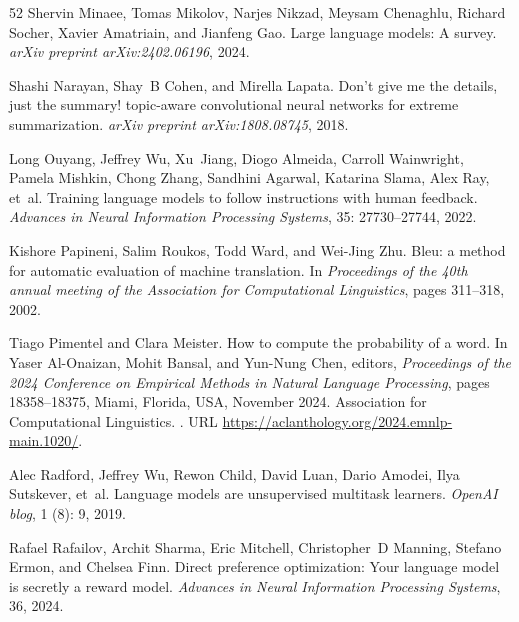 \begin{thebibliography}{52}
Shervin Minaee, Tomas Mikolov, Narjes Nikzad, Meysam Chenaghlu, Richard Socher, Xavier Amatriain, and Jianfeng Gao.
\newblock Large language models: A survey.
\newblock \emph{arXiv preprint arXiv:2402.06196}, 2024.

Shashi Narayan, Shay~B Cohen, and Mirella Lapata.
\newblock Don't give me the details, just the summary! topic-aware convolutional neural networks for extreme summarization.
\newblock \emph{arXiv preprint arXiv:1808.08745}, 2018.

Long Ouyang, Jeffrey Wu, Xu~Jiang, Diogo Almeida, Carroll Wainwright, Pamela Mishkin, Chong Zhang, Sandhini Agarwal, Katarina Slama, Alex Ray, et~al.
\newblock Training language models to follow instructions with human feedback.
\newblock \emph{Advances in Neural Information Processing Systems}, 35: 27730--27744, 2022.

Kishore Papineni, Salim Roukos, Todd Ward, and Wei-Jing Zhu.
\newblock Bleu: a method for automatic evaluation of machine translation.
\newblock In \emph{Proceedings of the 40th annual meeting of the Association for Computational Linguistics}, pages 311--318, 2002.

Tiago Pimentel and Clara Meister.
\newblock How to compute the probability of a word.
\newblock In Yaser Al-Onaizan, Mohit Bansal, and Yun-Nung Chen, editors, \emph{Proceedings of the 2024 Conference on Empirical Methods in Natural Language Processing}, pages 18358--18375, Miami, Florida, USA, November 2024. Association for Computational Linguistics.
\newblock {}.
\newblock URL \url{https://aclanthology.org/2024.emnlp-main.1020/}.

Alec Radford, Jeffrey Wu, Rewon Child, David Luan, Dario Amodei, Ilya Sutskever, et~al.
\newblock Language models are unsupervised multitask learners.
\newblock \emph{OpenAI blog}, 1 (8): 9, 2019.

Rafael Rafailov, Archit Sharma, Eric Mitchell, Christopher~D Manning, Stefano Ermon, and Chelsea Finn.
\newblock Direct preference optimization: Your language model is secretly a reward model.
\newblock \emph{Advances in Neural Information Processing Systems}, 36, 2024.


\end{thebibliography}

